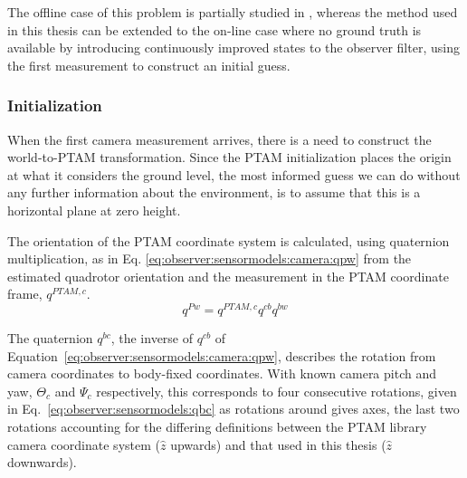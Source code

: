     The offline case of this problem is partially studied in \citep{hayashi2010},
    whereas the method used in this thesis can be extended to the on-line
    case where no ground truth is available by introducing continuously improved
    states to the observer filter, using the first measurement to construct
    an initial guess.


    \subsubsection{Initialization}
        \label{sssec:observer:sensormodels:camera:initialization}
        When the first camera measurement arrives, there is a need to construct
        the world-to-PTAM transformation.
        Since the PTAM initialization places the origin at what it
        considers the ground level, the most informed guess we can do
        without any further information about the environment, is
        to assume that this is a horizontal plane at zero height.

        The orientation of the PTAM coordinate system is calculated,
        using quaternion multiplication, as in Eq. \eqref{eq:observer:sensormodels:camera:qpw}
        from the estimated quadrotor orientation and the measurement in the
        PTAM coordinate frame, $q^{PTAM,c}$.
        \begin{equation}
            \label{eq:observer:sensormodels:camera:qpw}
            q^{Pw} = q^{PTAM,c} q^{cb} q^{bw}
        \end{equation}

        The quaternion $q^{bc}$, the inverse of $q^{cb}$ of Equation~\ref{eq:observer:sensormodels:camera:qpw},
        describes the rotation from camera coordinates to body-fixed coordinates.
        With known camera pitch and yaw, $\Theta_{c}$ and $\Psi_{c}$ respectively,
        this corresponds to four consecutive rotations, given in
        Eq.~\eqref{eq:observer:sensormodels:qbc} as rotations around gives axes,
        the last two rotations accounting for the differing definitions between the PTAM library
        camera coordinate system ($\hat{z}$ upwards) and that used in this thesis ($\hat{z}$ downwards).

